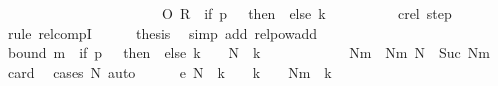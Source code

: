 \begin{isabellebody}
\ \ \ \ \ \ \ \ \ \ \ \ \ \ \ \ \ \ \ \ \ \ \ O\ R{\isacharprime}{\kern0pt}\ {\isacharcircum}{\kern0pt}{\isacharcircum}{\kern0pt}\ {\isacharparenleft}{\kern0pt}if\ {\isacharquery}{\kern0pt}p\ {\isacharequal}{\kern0pt}\ {}\ then\ {}\ else\ {\isacharquery}{\kern0pt}k\ {\isacharplus}{\kern0pt}\ {}{\isacharparenright}{\kern0pt}{\isachardoublequoteclose}\isanewline
\ \ \ \ \ \ \isamarkupfalse%
\ c{}{\isacharunderscore}{\kern0pt}rel\ step\ \isamarkupfalse%
\ {\isacharparenleft}{\kern0pt}rule\ relcompI{\isacharparenright}{\kern0pt}\isanewline
\ \ \ \ \isamarkupfalse%
\ {\isacharquery}{\kern0pt}thesis\ \isamarkupfalse%
\ {\isacharparenleft}{\kern0pt}simp\ add{\isacharcolon}{\kern0pt}\ relpow{\isacharunderscore}{\kern0pt}add{\isacharparenright}{\kern0pt}\isanewline
\ \ \isamarkupfalse%
\isanewline
\ \ \isamarkupfalse%
\ bound{\isacharcolon}{\kern0pt}\ {\isachardoublequoteopen}m{}\ {\isacharplus}{\kern0pt}\ {\isacharparenleft}{\kern0pt}if\ {\isacharquery}{\kern0pt}p\ {\isacharequal}{\kern0pt}\ {}\ then\ {}\ else\ {\isacharquery}{\kern0pt}k\ {\isacharplus}{\kern0pt}\ {}{\isacharparenright}{\kern0pt}\ {\isasymle}\ {\isacharquery}{\kern0pt}N\ {\isacharasterisk}{\kern0pt}\ {\isacharparenleft}{\kern0pt}{\isacharquery}{\kern0pt}k\ {\isacharplus}{\kern0pt}\ {}{\isacharparenright}{\kern0pt}{\isachardoublequoteclose}\isanewline
\ \ \isamarkupfalse%
\ {\isacharminus}{\kern0pt}\isanewline
\ \ \ \ \isamarkupfalse%
\ Nm\ \ Nm{\isacharcolon}{\kern0pt}\ {\isachardoublequoteopen}{\isacharquery}{\kern0pt}N\ {\isacharequal}{\kern0pt}\ Suc\ Nm{\isachardoublequoteclose}\ \isamarkupfalse%
\ card{}\ \isamarkupfalse%
\ {\isacharparenleft}{\kern0pt}cases\ {\isacharquery}{\kern0pt}N{\isacharparenright}{\kern0pt}\ auto\isanewline
\ \ \ \ \isamarkupfalse%
\ e{}{\isacharcolon}{\kern0pt}\ {\isachardoublequoteopen}{\isacharquery}{\kern0pt}N\ {\isacharasterisk}{\kern0pt}\ {\isacharparenleft}{\kern0pt}{\isacharquery}{\kern0pt}k\ {\isacharplus}{\kern0pt}\ {}{\isacharparenright}{\kern0pt}\ {\isacharequal}{\kern0pt}\ {\isacharparenleft}{\kern0pt}{\isacharquery}{\kern0pt}k\ {\isacharplus}{\kern0pt}\ {}{\isacharparenright}{\kern0pt}\ {\isacharplus}{\kern0pt}\ Nm\ {\isacharasterisk}{\kern0pt}\ {\isacharparenleft}{\kern0pt}{\isacharquery}{\kern0pt}k\ {\isacharplus}{\kern0pt}\ {}{\isacharparenright}{\kern0pt}{\isachardoublequoteclose}\ \isamarkupfalse%

\end{isabellebody}
